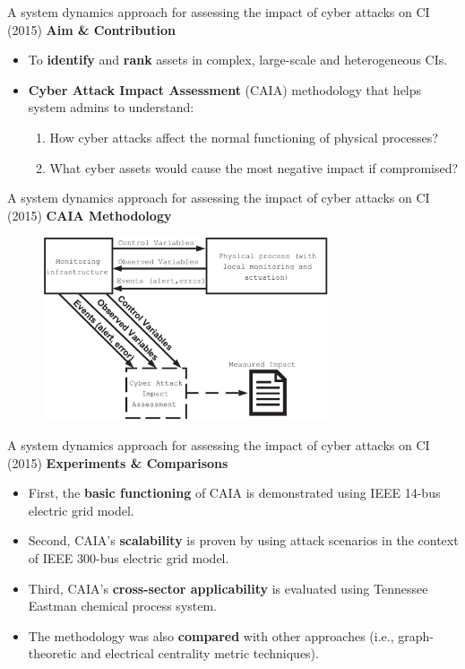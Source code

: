 \documentclass[compress]{beamer}
\begin{document}
\begin{frame}{A system dynamics approach for assessing the impact of cyber attacks on CI (2015)}
    \textbf{Aim \& Contribution}
    \begin{itemize}
     \item To \textbf{identify} and \textbf{rank} assets in complex, large-scale and heterogeneous CIs.
     \item \textbf{Cyber Attack Impact Assessment} (CAIA) methodology that helps system admins to understand:
     \begin{enumerate}
      \item How cyber attacks affect the normal functioning of physical processes?
      \item What cyber assets would cause the most negative impact if compromised?
     \end{enumerate}
    \end{itemize}
\end{frame}
\begin{frame}{A system dynamics approach for assessing the impact of cyber attacks on CI (2015)}
    \textbf{CAIA Methodology}
    \begin{figure}
      \centering
      \includegraphics[width = 0.75\textwidth]{./images/caia-method.png}
      \label{fig:caia-method}
    \end{figure}
\end{frame}
\begin{frame}{A system dynamics approach for assessing the impact of cyber attacks on CI (2015)}
    \textbf{Experiments \& Comparisons}
    \begin{itemize}
     \item First, the \textbf{basic functioning} of CAIA is demonstrated using IEEE 14-bus electric grid model.
     \item Second, CAIA's \textbf{scalability} is proven by using attack scenarios in the context of IEEE 300-bus electric grid model.
     \item Third, CAIA's \textbf{cross-sector applicability} is evaluated using Tennessee Eastman chemical process system.
     \item The methodology was also \textbf{compared} with other approaches (i.e., graph-theoretic and electrical centrality metric techniques).
    \end{itemize}
\end{frame}
\end{document}
